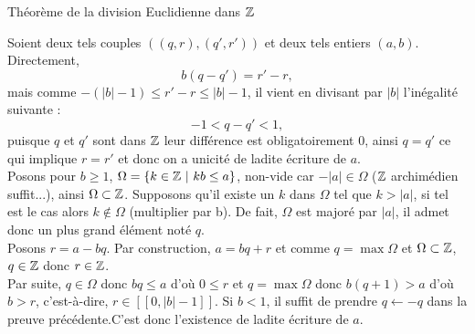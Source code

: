 \documentclass{article}
\begin{document}
\begin{question_kholle}
	[\noindent Pour tout couple d'entiers relatifs $a$ et $b$, $b$ non nul, il existe un unique couple d'entiers relatifs $q$ et $r$ tel que $a = bq +r$ et $0 \leq r \leq |b| -1$]
	{ Théorème de la division Euclidienne dans $\mathbb Z $ }

Soient deux tels couples $((q,r),(q',r'))$ et deux tels entiers $(a,b)$. \\
Directement, 
\[
b(q-q') = r'-r,
\]
mais comme $-(|b|-1) \leq r' - r \leq |b| -1$, il vient en divisant par $|b|$ l'inégalité suivante : 
\[
-1 < q - q' < 1,
\]
puisque $q$ et $q'$ sont dans $\mathbb Z$ leur différence est obligatoirement $0$, ainsi $q = q'$ ce qui implique $ r= r'$ et donc on a unicité de ladite écriture de $a$.
\newline
\\
Posons pour $b \geq 1$, $\Omega = \{ k\in \mathbb Z  \ | \ kb \leq a \}$, non-vide car $-|a|\in \Omega$ ($\mathbb Z$ archimédien suffit...), ainsi $\Omega \subset \mathbb Z$. Supposons qu'il existe un $k$ dans $\Omega$ tel que $k > |a|$, si tel est le cas alors $k\notin \Omega$ (multiplier par b). De fait, $\Omega$ est majoré par $|a|$, il admet donc un plus grand élément noté $q$. \\
Posons $r = a - bq$. Par construction, $a = bq + r$ et comme $q = \max \Omega$ et $\Omega \subset \mathbb Z$, $q\in \mathbb Z$ donc $r \in \mathbb Z$.
\\
Par suite, $q\in \Omega$ donc $bq \leq a$ d'où $0\leq r$ et $q=\max \Omega$ donc $b(q+1) > a$ d'où $b > r$, c'est-à-dire, $r\in [\![ 0, |b| -1 ]\!]$. Si $b< 1$, il suffit de prendre $q \leftarrow -q$ dans la preuve précédente.C'est donc l'existence de ladite écriture de $a$.
\end{question_kholle}
\end{document}
